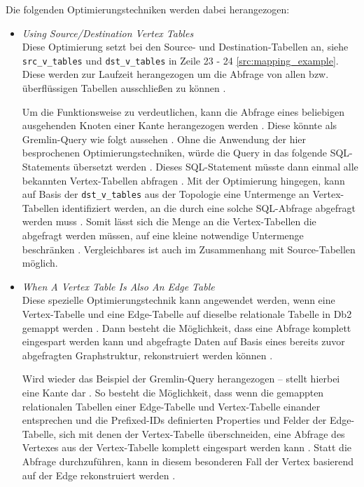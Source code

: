 Die folgenden Optimierungstechniken werden dabei herangezogen:
\begin{itemize}
    \item \textit{Using Source/Destination Vertex Tables}\\
    Diese Optimierung setzt bei den Source- und Destination-Tabellen an, siehe \texttt{src\_v\_tables} und \texttt{dst\_v\_tables} in Zeile 23 - 24 \autoref{src:mapping_example}. Diese werden zur Laufzeit herangezogen um die Abfrage von allen bzw. überflüssigen Tabellen ausschließen zu können \cite{sigmod_tian}.

    Um die Funktionsweise zu verdeutlichen, kann die Abfrage eines beliebigen ausgehenden Knoten einer Kante herangezogen werden \cite{sigmod_tian}. Diese könnte als Gremlin-Query wie folgt aussehen  \cite{sigmod_tian}. Ohne die Anwendung der hier besprochenen Optimierungstechniken, würde die Query in das folgende SQL-Statements übersetzt werden  \cite{sigmod_tian}. Dieses SQL-Statement müsste dann einmal alle bekannten Vertex-Tabellen abfragen \cite{sigmod_tian}. Mit der Optimierung hingegen, kann auf Basis der \texttt{dst\_v\_tables} aus der Topologie eine Untermenge an Vertex-Tabellen identifiziert werden, an die durch eine solche SQL-Abfrage abgefragt werden muss \cite{sigmod_tian}. Somit lässt sich die Menge an die Vertex-Tabellen die abgefragt werden müssen, auf eine kleine notwendige Untermenge beschränken \cite{sigmod_tian}. Vergleichbares ist auch im Zusammenhang mit Source-Tabellen möglich.

    \item \textit{When A Vertex Table Is Also An Edge Table}\\
    Diese spezielle Optimierungstechnik kann angewendet werden, wenn eine Vertex-Tabelle und eine Edge-Tabelle auf dieselbe relationale Tabelle in Db2 gemappt werden \cite{sigmod_tian}. Dann besteht die Möglichkeit, dass eine Abfrage komplett eingespart werden kann und abgefragte Daten auf Basis eines  bereits zuvor abgefragten Graphstruktur, rekonstruiert werden können \cite{sigmod_tian}. 

    Wird wieder das Beispiel der Gremlin-Query  herangezogen --  stellt hierbei eine Kante dar \cite{sigmod_tian}. So besteht die Möglichkeit, dass wenn die gemappten relationalen Tabellen einer Edge-Tabelle und Vertex-Tabelle einander entsprechen und die Prefixed-IDs definierten Properties und Felder der Edge-Tabelle, sich mit denen der Vertex-Tabelle überschneiden, eine Abfrage des Vertexes aus der Vertex-Tabelle komplett eingespart werden kann \cite{sigmod_tian}. Statt die Abfrage durchzuführen, kann in diesem besonderen Fall der Vertex basierend auf der Edge  rekonstruiert werden \cite{sigmod_tian}.


\end{itemize}
